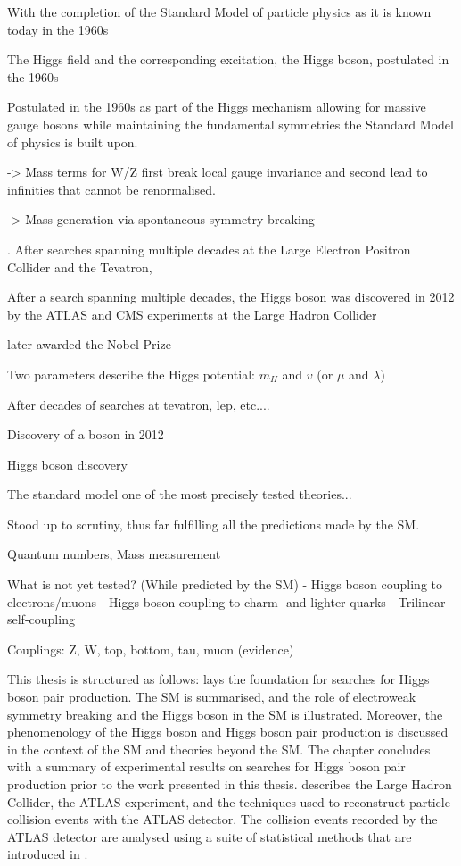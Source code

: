 With the completion of the Standard Model of particle physics as it is known
today in the 1960s

The Higgs field and the corresponding excitation, the Higgs boson, postulated in
the 1960s

\cite{Englert:1964et,Higgs:1964pj}


Postulated in the 1960s as part of the Higgs mechanism allowing for massive
gauge bosons while maintaining the fundamental symmetries the Standard Model of
physics is built upon.


-> Mass terms for W/Z first break local gauge invariance and second lead to
infinities that cannot be renormalised.

-> Mass generation via spontaneous symmetry breaking


. After searches spanning multiple decades at the Large Electron
Positron Collider and the Tevatron,

After a search spanning multiple decades, the Higgs boson was discovered in 2012
by the ATLAS and CMS experiments at the Large Hadron Collider

later awarded the Nobel Prize






Two parameters describe the Higgs potential: $m_{H}$ and $v$ (or $\mu$ and
$\lambda$)

After decades of searches at tevatron, lep, etc....

Discovery of a boson \cite{HIGG-2012-27,CMS-HIG-12-028} in 2012

Higgs boson discovery



The standard model one of the most precisely tested theories...

Stood up to scrutiny, thus far fulfilling all the predictions made by the SM.

Quantum numbers, Mass measurement

What is not yet tested? (While predicted by the SM)
- Higgs boson coupling to electrons/muons
- Higgs boson coupling to charm- and lighter quarks
- Trilinear self-coupling


Couplings: Z, W, top, bottom, tau, muon (evidence)

\clearpage

This thesis is structured as follows:  lays the
foundation for searches for Higgs boson pair production. The SM is summarised,
and the role of electroweak symmetry breaking and the Higgs boson in the SM is
illustrated. Moreover, the phenomenology of the Higgs boson and Higgs boson pair
production is discussed in the context of the SM and theories beyond the SM. The
chapter concludes with a summary of experimental results on searches for Higgs
boson pair production prior to the work presented in this thesis.
 describes the Large Hadron Collider, the ATLAS
experiment, and the techniques used to reconstruct particle collision events
with the ATLAS detector. The collision events recorded by the ATLAS detector are
analysed using a suite of statistical methods that are introduced in
.

